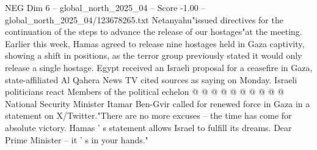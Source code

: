 \begin{textsample}{NEG Dim 6 – global\_north\_2025\_04 – Score -1.00 – global\_north\_2025\_04/123678265.txt}
Netanyahu"issued directives for the continuation of the steps to advance the release of our hostages"at the meeting.
Earlier this week, Hamas agreed to release nine hostages held in Gaza captivity, showing a shift in positions, as the terror group previously stated it would only release a single hostage.
Egypt received an Israeli proposal for a ceasefire in Gaza, state-affiliated Al Qahera News TV cited sources as saying on Monday.
Israeli politicians react Members of the political echelon @ @ @ @ @ @ @ @ @ @ National Security Minister Itamar Ben-Gvir called for renewed force in Gaza in a statement on X/Twitter."There are no more excuses -- the time has come for absolute victory.
Hamas ' s statement allows Israel to fulfill its dreams.
Dear Prime Minister -- it ' s in your hands."

\end{textsample}
